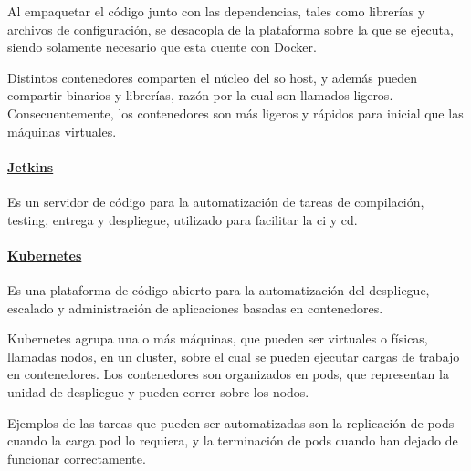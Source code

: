 Al empaquetar el código junto con las dependencias, tales como librerías y archivos de configuración, se desacopla de la plataforma sobre la que se ejecuta, siendo solamente necesario que esta cuente con Docker.

Distintos contenedores comparten el núcleo del \acrfull{so} host, y además pueden compartir binarios y librerías, razón por la cual son llamados ligeros. Consecuentemente, los contenedores son más ligeros y rápidos para inicial que las máquinas virtuales.

\paragraph{\href{https://www.jenkins.io/}{Jetkins}}
Es un servidor de código para la automatización de tareas de compilación, testing, entrega y despliegue, utilizado para facilitar la \acrfull{ci} y \acrfull{cd}.

\paragraph{\href{https://kubernetes.io/es/}{Kubernetes}}
Es una plataforma de código abierto para la automatización del despliegue, escalado y administración de aplicaciones basadas en contenedores.

Kubernetes agrupa una o más máquinas, que pueden ser virtuales o físicas, llamadas nodos, en un cluster, sobre el cual se pueden ejecutar cargas de trabajo en contenedores. Los contenedores son organizados en pods, que representan la unidad de despliegue y pueden correr sobre los nodos.

Ejemplos de las tareas que pueden ser automatizadas son la replicación de pods cuando la carga pod lo requiera, y la terminación de pods cuando han dejado de funcionar correctamente.
